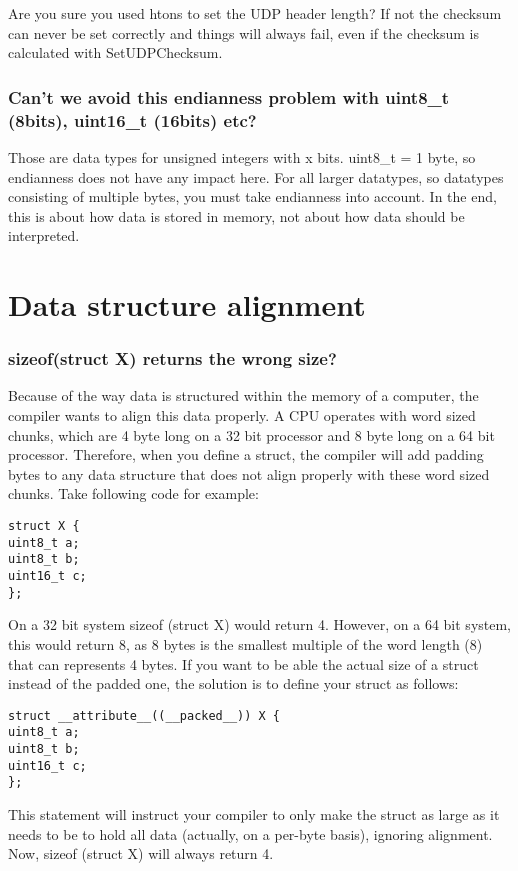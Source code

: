 \documentclass[a4paper]{article}
\begin{document}
Are you sure you used htons to set the UDP header length? If not the
checksum can never be set correctly and things will always fail, even if
the checksum is calculated with SetUDPChecksum.

\subsubsection*{Can't we avoid this endianness problem with uint8\_t (8bits), uint16\_t
(16bits) etc?}

Those are data types for unsigned integers with x bits. uint8\_t = 1
byte, so endianness does not have any impact here. For all larger
datatypes, so datatypes consisting of multiple bytes, you must take
endianness into account. In the end, this is about how data is stored in
memory, not about how data should be interpreted.

\section{Data structure alignment}
\subsubsection*{sizeof(struct X) returns the wrong size?}
Because of the way data is structured within the memory of a computer, the compiler wants to align this data properly. A CPU operates with word sized chunks, which are 4 byte long on a 32 bit processor and 8 byte long on a 64 bit processor. Therefore, when you define a struct, the compiler will add padding bytes to any data structure that does not align properly with these word sized chunks. Take following code for example:

\begin{lstlisting}
struct X {
uint8_t a;
uint8_t b;
uint16_t c;
};
\end{lstlisting}

On a 32 bit system sizeof (struct X) would return 4. However, on a 64 bit system, this would return 8, as 8 bytes is the smallest multiple of the word length (8) that can represents 4 bytes. If you want to be able the actual size of a struct instead of the padded one, the solution is to define your struct as follows:

\begin{lstlisting}
struct __attribute__((__packed__)) X {
uint8_t a;
uint8_t b;
uint16_t c;
};
\end{lstlisting}

This statement will instruct your compiler to only make the struct as large as it needs to be to hold all data (actually, on a per-byte basis), ignoring alignment. Now, sizeof (struct X) will always return 4.
\end{document}
